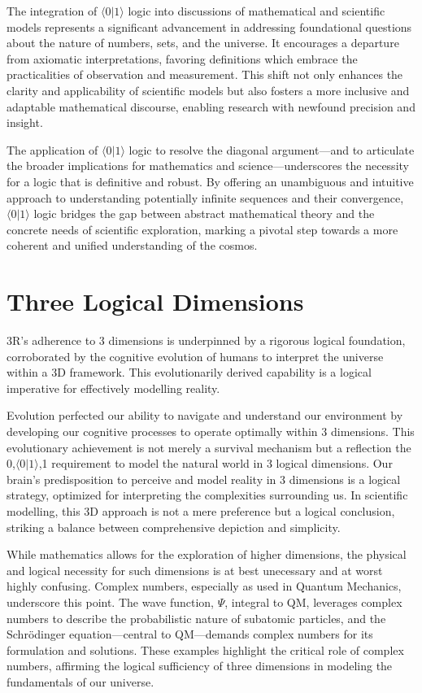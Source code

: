 \documentclass[12pt]{article}
\newcommand{\qbit}{\ensuremath{\langle 0 | 1 \rangle}}
\begin{document}
The integration of \(\qbit\) logic into discussions of mathematical and scientific models represents a significant advancement in addressing foundational questions about the nature of numbers, sets, and the universe. It encourages a departure from axiomatic interpretations, favoring definitions which embrace the practicalities of observation and measurement. This shift not only enhances the clarity and applicability of scientific models but also fosters a more inclusive and adaptable mathematical discourse, enabling research with newfound precision and insight.

The application of \(\qbit\) logic to resolve the diagonal argument—and to articulate the broader implications for mathematics and science—underscores the necessity for a logic that is definitive and robust. By offering an unambiguous and intuitive approach to understanding potentially infinite sequences and their convergence, \(\qbit\) logic bridges the gap between abstract mathematical theory and the concrete needs of scientific exploration, marking a pivotal step towards a more coherent and unified understanding of the cosmos.

\section*{Three Logical Dimensions}
3R's adherence to 3 dimensions is underpinned by a rigorous logical foundation, corroborated by the cognitive evolution of humans to interpret the universe within a 3D framework. This evolutionarily derived capability is a logical imperative for effectively modelling reality.

Evolution perfected our ability to navigate and understand our environment by developing our cognitive processes to operate optimally within 3 dimensions. This evolutionary achievement is not merely a survival mechanism but a reflection the {0,\(\qbit\),1} requirement to model the natural world in 3 logical dimensions. Our brain's predisposition to perceive and model reality in 3 dimensions is a logical strategy, optimized for interpreting the complexities surrounding us. In scientific modelling, this 3D approach is not a mere preference but a logical conclusion, striking a balance between comprehensive depiction and simplicity.

While mathematics allows for the exploration of higher dimensions, the physical and logical necessity for such dimensions is at best unecessary and at worst highly confusing. Complex numbers, especially as used in Quantum Mechanics, underscore this point. The wave function, \(\Psi\), integral to QM, leverages complex numbers to describe the probabilistic nature of subatomic particles, and the Schrödinger equation—central to QM—demands complex numbers for its formulation and solutions. These examples highlight the critical role of complex numbers, affirming the logical sufficiency of three dimensions in modeling the fundamentals of our universe.
\end{document}
